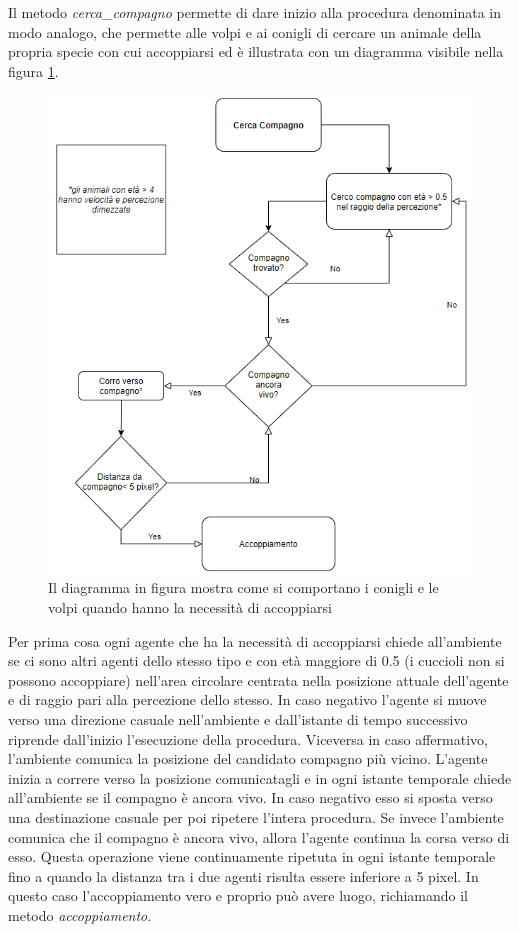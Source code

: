 \documentclass[11pt]{article}
\begin{document}
Il metodo \emph{cerca\_compagno} permette di dare inizio alla procedura denominata in modo analogo, che permette alle volpi e ai conigli di cercare un animale della propria specie con cui accoppiarsi ed è illustrata con un diagramma visibile nella figura \ref{fig:diagrammaAccoppiamento}.
\begin{figure}
     \centering
     \includegraphics[scale = 0.75]{Cerca_Compagno.PNG}
     \caption{Il diagramma in figura mostra come si comportano i conigli e le volpi quando hanno la necessità di accoppiarsi}
     \label{fig:diagrammaAccoppiamento}
\end{figure}
Per prima cosa ogni agente che ha la necessità di accoppiarsi chiede all'ambiente se ci sono altri agenti dello stesso tipo e con età maggiore di 0.5 (i cuccioli non si possono accoppiare) nell'area circolare centrata nella posizione attuale dell'agente e di raggio pari alla percezione dello stesso.
In caso negativo l'agente si muove verso una direzione casuale nell'ambiente e dall'istante di tempo successivo riprende dall'inizio l'esecuzione della procedura. Viceversa in caso affermativo, l'ambiente comunica la posizione del candidato compagno più vicino. L'agente inizia a correre verso la posizione comunicatagli e in ogni istante temporale chiede all'ambiente se il compagno è ancora vivo. In caso negativo esso si sposta verso una destinazione casuale per poi ripetere l'intera procedura. Se invece l'ambiente comunica che il compagno è ancora vivo, allora l'agente continua la corsa verso di esso. Questa operazione viene continuamente ripetuta in ogni istante temporale fino a quando la distanza tra i due agenti risulta essere inferiore a 5 pixel. In questo caso l'accoppiamento vero e proprio può avere luogo, richiamando il metodo \emph{accoppiamento}. 
\end{document}
